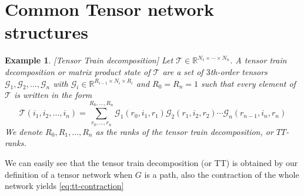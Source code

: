 \documentclass[11pt,a4paper,openright,oneside]{book}
\numberwithin{equation}{section}
\newtheorem{example0}[defn0]{Example}
\newenvironment{example}{ \begin{example0}\rm}{\end{example0}}
\newcommand{\refeq}[1]{\cref{#1}}
\begin{document}
\section{Common Tensor network structures}

\begin{example}[Tensor Train decomposition]
     Let $\mathcal{T} \in \mathbb{R}^{N_1 \times \cdots \times N_n}$. A tensor
train decomposition or matrix product state of $\mathcal{T}$ are a set of $3$th-order tensors $\mathcal{G}_1,\mathcal{G}_2,\dots,\mathcal{G}_n$ with
    $\mathcal{G}_i \in \mathbb{R}^{R_{i-1} \times N_i \times R_i}$ and $R_0 = R_n = 1$ such that every element of $\mathcal{T}$ is written in the
    form
    \begin{equation} \label{eq:tt-contraction}
    \mathcal{T}(i_1,i_2,\dots,i_n) = \sum_{r_0, \dots, r_n}^{R_0, \dots, R_n} \mathcal{G}_1(r_0, i_1, r_1) \mathcal{G}_2 (r_1, i_2, r_2) \cdots \mathcal{G}_n(r_{n-1}, i_n, r_n)
\end{equation}
We denote $R_0, R_1, \dots, R_n$ as the ranks of the tensor train decomposition, or $TT$-ranks.
\end{example}

We can easily see that the tensor train decomposition (or TT) is obtained by our definition of a tensor network when $G$ is a path, also
the contraction of the whole network yields \refeq{eq:tt-contraction}
\end{document}
